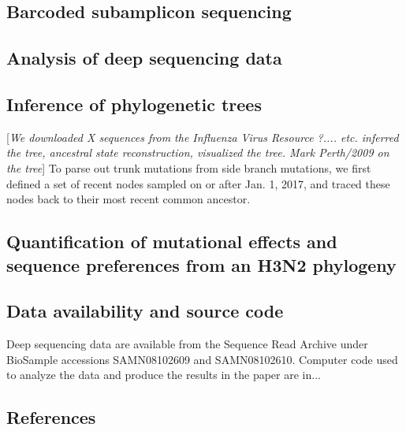 \documentclass[9pt,twocolumn,twoside]{pnas-new}
\newcommand{\comment}[1]{{\color{red}[\textsl{#1}]}}
\begin{document}
{\subsection*{Barcoded subamplicon sequencing}

\subsection*{Analysis of deep sequencing data}

\subsection*{Inference of phylogenetic trees}
\comment{We downloaded X sequences from the Influenza Virus Resource ?.... etc. inferred the tree, ancestral state reconstruction, visualized the tree. Mark Perth/2009 on the tree}
To parse out trunk mutations from side branch mutations, we first defined a set of recent nodes sampled on or after Jan. 1, 2017, and traced these nodes back to their most recent common ancestor. 

\subsection*{Quantification of mutational effects and sequence preferences from an H3N2 phylogeny}

\subsection*{Data availability and source code}
Deep sequencing data are available from the Sequence Read Archive under BioSample accessions SAMN08102609 and SAMN08102610. Computer code used to analyze the data and produce the results in the paper are in...
}

\showmatmethods{} %


\showacknow{} %


\subsection*{References}

\end{document}
